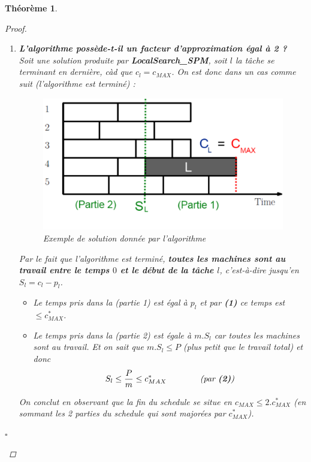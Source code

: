 \documentclass[12pt]{article}
\newcommand{\cqfd}{\begin{flushright}$\square$\end{flushright}}
\newtheorem{thm}{Th\'eor\`eme}[section]
\newtheorem{proof}{Preuve}[section]
\begin{document}
\begin{thm}
\begin{proof}
\begin{enumerate}
A chaque itération on va soit réduire $c_{MAX}$, soit diminuer le nombre de machines atteignant $c_{MAX}$ \\ $\Rightarrow$ nombre limité
d'étapes.\\

\item \textbf{L'algorithme possède-t-il un facteur d'approximation égal à 2 ?}\\
Soit une solution produite par \textbf{LocalSearch\_SPM}, soit $l$ la tâche se terminant en dernière, càd que $c_l = c_{MAX}$. On est
donc dans un cas comme suit (l'algorithme est terminé) :

\begin{figure}[h!]
    \begin{center}
    \includegraphics[scale=0.45]{spm4.pdf}
    \caption{Exemple de solution donnée par l'algorithme}
    \end{center}
\end{figure}


Par le fait que l'algorithme est terminé, \textbf{toutes les machines sont au travail entre le temps $0$ et le début de la tâche $l$},
c'est-à-dire jusqu'en $S_l = c_l-p_l$.

\begin{itemize}
\item Le temps pris dans la \textit{(partie 1)} est égal à $p_l$ et par \textbf{(1)} ce temps est $\leq c^*_{MAX}$.
\item Le temps pris dans la \textit{(partie 2)} est égale à $m.S_l$ car toutes les machines sont au travail. Et on sait que $m.S_l \leq
P$ \textit{(plus petit que le travail total)} et donc $$S_l \leq \frac{P}{m} \leq c^*_{MAX} \qquad\qquad \text{\textit{(par
\textbf{(2)})}}$$
\end{itemize}
On conclut en observant que la fin du schedule se situe en $c_{MAX} \leq 2.c^*_{MAX}$ (en sommant les 2 parties du schedule qui sont
majorées par $c^*_{MAX}$).
\end{enumerate}
\cqfd
\end{proof}
\end{thm}
\end{document}
